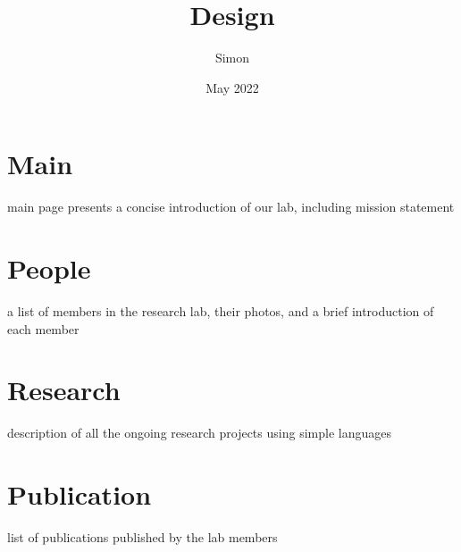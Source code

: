 \documentclass{article}
\title{Design}
\author{Simon}
\date{May 2022}
\begin{document}
\maketitle


\section{Main}
main page presents a concise introduction of our lab, including mission statement

\section{People}
a list of members in the research lab, their photos, and a brief introduction of each member

\section{Research}
description of all the ongoing research projects using simple languages

\section{Publication}
list of publications published by the lab members
\end{document}
